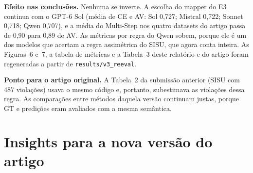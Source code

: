 \documentclass[11pt,a4paper]{article}
\begin{document}
\noindent\textbf{Efeito nas conclusões.} Nenhuma se inverte. A escolha do mapper do E3 continua com o GPT-6 Sol
(média de CE e AV: Sol 0,727; Mistral 0,722; Sonnet 0,718; Qwen 0,707), e a média do Multi-Step nos quatro
datasets do artigo passa de 0,90 para 0,89 de AV. As métricas por regra do Qwen sobem, porque ele é um dos
modelos que acertam a regra assimétrica do SISU, que agora conta inteira. As Figuras~6 e~7, a tabela de métricas e
a Tabela~3 deste relatório e do artigo foram regeneradas a partir de \texttt{results/v3\_reeval}.

\noindent\textbf{Ponto para o artigo original.} A Tabela~2 da submissão anterior (SISU com 487 violações) usava o
mesmo código e, portanto, subestimava as violações dessa regra. As comparações entre métodos daquela versão
continuam justas, porque GT e predições eram avaliados com a mesma semântica.

\section{Insights para a nova versão do artigo}
\end{document}
